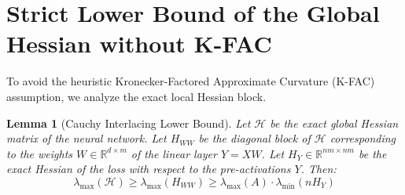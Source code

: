 \documentclass[11pt, a4paper]{article}
\newtheorem{lemma}{Lemma}
\begin{document}
\section{Strict Lower Bound of the Global Hessian without K-FAC}

To avoid the heuristic Kronecker-Factored Approximate Curvature (K-FAC) assumption, we analyze the exact local Hessian block.

\begin{lemma}[Cauchy Interlacing Lower Bound] \label{lemma:cauchy}
Let $\mathcal{H}$ be the exact global Hessian matrix of the neural network. Let $H_{WW}$ be the diagonal block of $\mathcal{H}$ corresponding to the weights $W \in \mathbb{R}^{d \times m}$ of the linear layer $Y = XW$. Let $H_Y \in \mathbb{R}^{nm \times nm}$ be the exact Hessian of the loss with respect to the pre-activations $Y$. Then:
\begin{equation}
    \lambda_{\max}(\mathcal{H}) \ge \lambda_{\max}(H_{WW}) \ge \lambda_{\max}(A) \cdot \lambda_{\min}(n H_{Y})
\end{equation}
\end{lemma}
\end{document}
